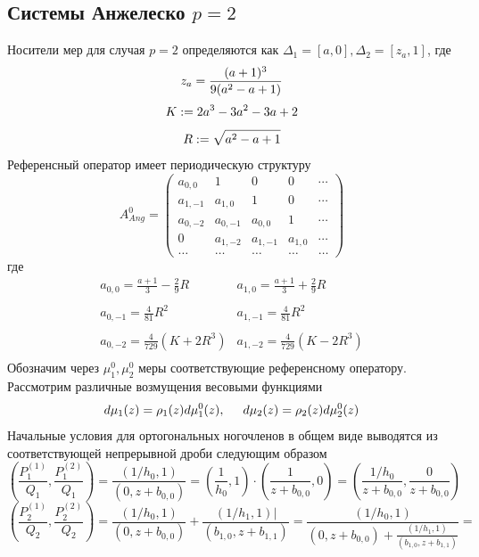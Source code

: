 \documentclass{report}
\begin{document}
\subsection{Системы Анжелеско $p=2$}
Носители мер для случая $p=2$ определяются как $\Delta_1=[a,0], \Delta_2 =[z_a,1]$, где 
$$
z_a=\frac{(a+1)^3}{9(a^2-a+1)} \\
$$
$$
K :=2a^3-3a^2-3a+2 \\ 
$$
$$
R :=\sqrt{a^2-a+1} \\
$$
Референсный оператор имеет периодическую структуру
$$
A^0_{Ang}=
\left(\begin{array}{cccccccccccc}
a_{0,0}  & 1 		& 0 	  & 0 		 &  \cdots \\
a_{1,-1} & a_{1,0}  & 1 	  & 0 		 &  \cdots \\
a_{0,-2} & a_{0,-1} & a_{0,0} & 1 		 &  \cdots \\
0 		 & a_{1,-2} & a_{1,-1} & a_{1,0} &  \cdots \\
\ldots & \ldots & \ldots & \ldots & \ldots
\end{array}\right)
$$
где 
$$
\begin{array}{llllllllllllllll}
a_{0,0} = \displaystyle\frac {a+1}{3}-\displaystyle\frac{2}{9}R & a_{1,0}=\displaystyle\frac{a+1}{3}+\displaystyle\frac{2}{9}R \\ \\ 
a_{0,-1}= \displaystyle\frac {4}{81}R^2 & a_{1,-1}=\displaystyle\frac{4}{81}R^2 \\ \\
a_{0,-2}= \displaystyle\frac {4}{729}(K+2R^3) & a_{1,-2}=\displaystyle\frac{4}{729}(K-2R^3) \\
\end{array}
$$
Обозначим через $\mu^0_1,\mu^0_2$ меры соответствующие референсному оператору. Рассмотрим различные возмущения весовыми функциями
$$
d\mu_1(z) = \rho_1(z) d\mu^0_1(z), \hspace{0.5cm} d\mu_2(z) = \rho_2(z) d\mu^0_2(z)
$$
\newpage
Начальные условия для ортогональных ногочленов в общем виде выводятся из соответствующей непрерывной дроби следующим образом
$$
\left(\frac{P_1^{(1)}}{Q_1},\frac{P_1^{(2)}}{Q_1} \right)=\displaystyle\frac{(1/h_0,1)}{(0,z+b_{0,0})}=\left(\frac{1}{h_0},1\right) \cdot \left(\frac{1}{z+b_{0,0}},0\right)=\left(\frac{1/h_0}{z+b_{0,0}},\frac{0}{z+b_{0,0}} \right)
$$
$$
\left(\frac{P_2^{(1)}}{Q_2},\frac{P_2^{(2)}}{Q_2} \right)=\displaystyle\frac{(1/h_0,1)}{(0,z+b_{0,0})} + \displaystyle\frac{(1/h_1,1)|}{(b_{1,0},z+b_{1,1})}=
\displaystyle\frac{(1/h_0,1)}{(0,z+b_{0,0})+ \displaystyle\frac{(1/h_1,1)}{(b_{1,0},z+b_{1,1})}}=
$$
\end{document}
